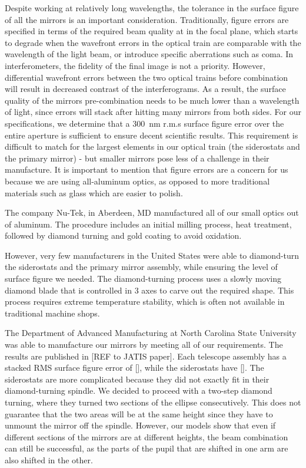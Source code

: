 Despite working at relatively long wavelengths, the tolerance in the surface figure of all the mirrors is an important consideration. Traditionally, figure errors are specified in terms of the required beam quality at in the focal plane, which starts to degrade when the wavefront errors in the optical train are comparable with the wavelength of the light beam, or introduce specific aberrations such as coma. In interferometers, the fidelity of the final image is not a priority. However, differential wavefront errors between the two optical trains before combination will result in decreased contrast of the interferograms. As a result, the surface quality of the mirrors pre-combination needs to be much lower than a wavelength of light, since errors will stack after hitting many mirrors from both sides. For our specifications, we determine that a \SI{300}{\nano\meter} r.m.s surface figure error over the entire aperture is sufficient to ensure decent scientific results. This requirement is difficult to match for the largest elements in our optical train (the siderostats and the primary mirror) - but smaller mirrors pose less of a challenge in their manufacture. It is important to mention that figure errors are a concern for us because we are using all-aluminum optics, as opposed to more traditional materials such as glass which are easier to polish.

The company Nu-Tek, in Aberdeen, MD manufactured all of our small optics out of aluminum. The procedure includes an initial milling process, heat treatment, followed by diamond turning and gold coating to avoid oxidation.

However, very few manufacturers in the United States were able to diamond-turn the siderostats and the primary mirror assembly, while ensuring the level of surface figure we needed. The diamond-turning process uses a slowly moving diamond blade that is controlled in 3 axes to carve out the required shape. This process requires extreme temperature stability, which is often not available in traditional machine shops. 

The Department of Advanced Manufacturing at North Carolina State University was able to manufacture our mirrors by meeting all of our requirements. The results are published in [REF to JATIS paper]. Each telescope assembly has a stacked RMS surface figure error of [], while the siderostats have []. The siderostats are more complicated because they did not exactly fit in their diamond-turning spindle. We decided to proceed with a two-step diamond turning, where they turned two sections of the ellipse consecutively. This does not guarantee that the two areas will be at the same height since they have to unmount the mirror off the spindle. However, our models show that even if different sections of the mirrors are at different heights, the beam combination can still be successful, as the parts of the pupil that are shifted in one arm are also shifted in the other. 




